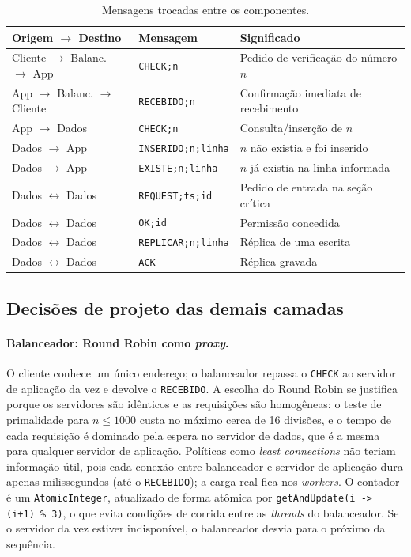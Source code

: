 \documentclass[11pt,a4paper]{article}
\newcommand{\msg}[1]{\texttt{#1}}
\newcommand{\classe}[1]{\texttt{#1}}
\begin{document}
\begin{table}[H]
\centering
\caption{Mensagens trocadas entre os componentes.}
\label{tab:protocolo}
\begin{tabular}{@{}lll@{}}
\toprule
\textbf{Origem $\rightarrow$ Destino} & \textbf{Mensagem} & \textbf{Significado} \\
\midrule
Cliente $\rightarrow$ Balanc. $\rightarrow$ App & \msg{CHECK;n}              & Pedido de verificação do número $n$ \\
App $\rightarrow$ Balanc. $\rightarrow$ Cliente & \msg{RECEBIDO;n}           & Confirmação imediata de recebimento \\
App $\rightarrow$ Dados                         & \msg{CHECK;n}              & Consulta/inserção de $n$ \\
Dados $\rightarrow$ App                         & \msg{INSERIDO;n;linha}     & $n$ não existia e foi inserido \\
Dados $\rightarrow$ App                         & \msg{EXISTE;n;linha}       & $n$ já existia na linha informada \\
\midrule
Dados $\leftrightarrow$ Dados                   & \msg{REQUEST;ts;id}        & Pedido de entrada na seção crítica \\
Dados $\leftrightarrow$ Dados                   & \msg{OK;id}                & Permissão concedida \\
Dados $\leftrightarrow$ Dados                   & \msg{REPLICAR;n;linha}     & Réplica de uma escrita \\
Dados $\leftrightarrow$ Dados                   & \msg{ACK}                 & Réplica gravada \\
\bottomrule
\end{tabular}
\end{table}

\subsection{Decisões de projeto das demais camadas}

\paragraph{Balanceador: Round Robin como \emph{proxy}.}
O cliente conhece um único endereço; o balanceador repassa o \msg{CHECK} ao servidor
de aplicação da vez e devolve o \msg{RECEBIDO}. A escolha do Round Robin se justifica
porque os servidores são idênticos e as requisições são homogêneas: o teste de
primalidade para $n \le 1000$ custa no máximo cerca de 16 divisões, e o tempo de
cada requisição é dominado pela espera no servidor de dados, que é a mesma para
qualquer servidor de aplicação. Políticas como \emph{least connections} não teriam
informação útil, pois cada conexão entre balanceador e servidor de aplicação dura
apenas milissegundos (até o \msg{RECEBIDO}); a carga real fica nos \emph{workers}.
O contador é um \classe{AtomicInteger}, atualizado de forma atômica por
\texttt{getAndUpdate(i -> (i+1) \% 3)}, o que evita condições de corrida entre as
\emph{threads} do balanceador. Se o servidor da vez estiver indisponível, o
balanceador desvia para o próximo da sequência.
\end{document}
